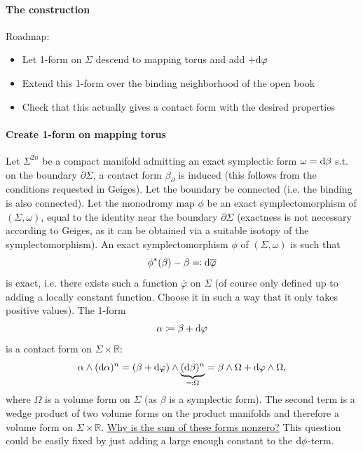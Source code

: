 \paragraph*{The construction}
Roadmap: 
\begin{itemize}
    \item Let 1-form on $\Sigma$ descend to mapping torus and add $+ \mathrm{d} \varphi$
    \item Extend this 1-form over the binding neighborhood of the open book
    \item Check that this actually gives a contact form with the desired properties
\end{itemize}

\paragraph*{Create 1-form on mapping torus}
Let $\Sigma^{2n}$ be a compact manifold admitting an exact symplectic form $\omega = \mathrm{d} \beta$ s.t. on the boundary $\partial \Sigma$, a contact form $\beta_\partial$ is induced (this follows from the conditions requested in Geiges).
Let the boundary be connected (i.e. the binding is also connected).
Let the monodromy map $\phi$ be an exact symplectomorphism of $(\Sigma, \omega)$,
equal to the identity near the boundary $\partial \Sigma$ (exactness is not necessary according to Geiges, as it can be obtained via a suitable isotopy of the symplectomorphism).
An exact symplectomorphism $\phi$ of $(\Sigma, \omega)$ is such that
\[
    \phi^*(\beta) - \beta \eqqcolon \mathrm{d} \overline{\varphi}  
\]
is exact, i.e. there exists such a function $\overline{\varphi}$ on $\Sigma$ (of course only defined up to adding a locally constant function. Choose it in such a way that it only takes positive values).
The 1-form 
\[
    \alpha \coloneqq \beta + \mathrm{d} \varphi
\]
is a contact form on $\Sigma \times \mathbb R$:
\[
    \alpha \wedge (\mathrm{d} \alpha)^{n} = (\beta + \mathrm{d} \varphi)\wedge \underbrace{(\mathrm{d} \beta)^n}_{\eqqcolon \Omega} = \beta \wedge \Omega + \mathrm{d} \varphi \wedge \Omega,
\]
where $\Omega$ is a volume form on $\Sigma$ (as $\beta$ is a symplectic form).
The second term is a wedge product of two volume forms on the product manifolds and therefore a volume form on $\Sigma \times \mathbb R$.
\underline{Why is the sum of these forms nonzero?} This question could be easily fixed by just adding a large enough constant to the $\mathrm{d}\phi$-term.

